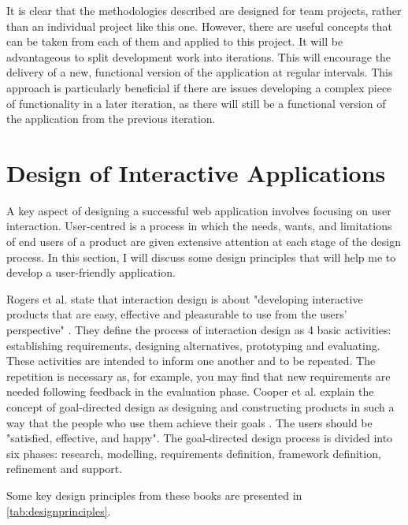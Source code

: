 \documentclass[authoryearcitations]{UoYCSproject}
\begin{document}
It is clear that the methodologies described are designed for team projects, rather than an individual project like this one. However, there are useful concepts that can be taken from each of them and applied to this project. It will be advantageous to split development work into iterations. This will encourage the delivery of a new, functional version of the application at regular intervals. This approach is particularly beneficial if there are issues developing a complex piece of functionality in a later iteration, as there will still be a functional version of the application from the previous iteration. 


\section{Design of Interactive Applications}

A key aspect of designing a successful web application involves focusing on user interaction. User-centred is a process in which the needs, wants, and limitations of end users of a product are given extensive attention at each stage of the design process. In this section, I will discuss some design principles that will help me to develop a user-friendly application. 

Rogers et al. state that interaction design is about "developing interactive products that are easy, effective and pleasurable to use from the users' perspective" \citep{Rogers2011}. They define the process of interaction design as 4 basic activities: establishing requirements, designing alternatives, prototyping and evaluating. These activities are intended to inform one another and to be repeated. The repetition is necessary as, for example, you may find that new requirements are needed following feedback in the evaluation phase. Cooper et al. explain the concept of goal-directed design as designing and constructing products in such a way that the people who use them achieve their goals \citep{Cooper2007}. The users should be "satisfied, effective, and happy". The goal-directed design process is divided into six phases: research, modelling, requirements definition, framework definition, refinement and support. 

Some key design principles from these books are presented in \autoref{tab:designprinciples}.
\end{document}

